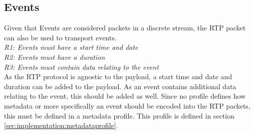\subsection{Events}
Given that Events are considered packets in a discrete stream, the RTP packet can also be used to transport events.\\

\noindent \textit{R1: Events must have a start time and date}\\
\textit{R2: Events must have a duration}\\
\textit{R3: Events must contain data relating to the event} \\

\noindent As the RTP protocol is agnostic to the payload, a start time and date and duration can be added to the payload. As an event contains additional data relating to the event, this should be added as well. Since no profile defines how metadata or more specifically an event should be encoded into the RTP packets, this must be defined in a metadata profile. This profile is defined in section \ref{sec:implementation:metadataprofile}.


